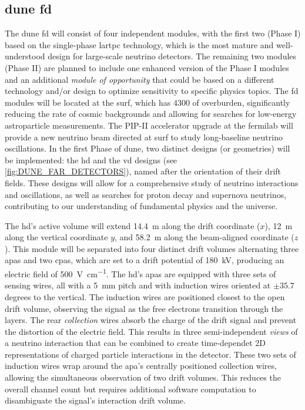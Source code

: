 \subsection{\gls{dune} \acrlong{fd}} \label{sec:DUNE_FD}

The \gls{dune} \gls{fd} will consist of four independent modules, with the first two (Phase I) based on the single-phase \gls{lartpc} technology, which is the most mature and well-understood design for large-scale neutrino detectors. The remaining two modules (Phase II) are planned to include one enhanced version of the Phase I modules and an additional \textit{module of opportunity} that could be based on a different technology and/or design to optimize sensitivity to specific physics topics. The \gls{fd} modules will be located at the \gls{surf}, which has \SI{4300}{\metersofwater} of overburden, significantly reducing the rate of cosmic backgrounds and allowing for searches for low-energy astroparticle measurements. The PIP-II accelerator upgrade at the \gls{fermilab} will provide a new neutrino beam directed at \gls{surf} to study long-baseline neutrino oscillations. In the first Phase of \gls{dune}, two distinct designs (or geometries) will be implemented: the \gls{hd} and the \gls{vd} designs (see \cref{fig:DUNE_FAR_DETECTORS}), named after the orientation of their drift fields. These designs will allow for a comprehensive study of neutrino interactions and oscillations, as well as searches for proton decay and supernova neutrinos, contributing to our understanding of fundamental physics and the universe.

The \gls{hd}'s active volume will extend \SI{14.4}{\meter} along the drift coordinate ($x$), \SI{12}{\meter} along the vertical coordinate $y$, and \SI{58.2}{\meter} along the beam-aligned coordinate ($z$). This module will be separated into four distinct drift volumes alternating three \glspl{apa} and two \glspl{cpa}, which are set to a drift potential of \SI{180}{\kilo\volt}, producing an electric field of \SI{500}{\volt\per\centi\meter}. The \gls{hd}'s \glspl{apa} are equipped with three sets of sensing wires, all with a \SI{5}{\milli\metre} pitch and with induction wires oriented at $\pm35.7$ degrees to the vertical. The induction wires are positioned closest to the open drift volume, observing the signal as the free electrons transition through the layers. The rear \textit{collection} wires absorb the charge of the drift signal and prevent the distortion of the electric field. This results in three semi-independent \textit{views} of a neutrino interaction that can be combined to create time-dependet 2D representations of charged particle interactions in the detector. These two sets of induction wires wrap around the \gls{apa}'s centrally positioned collection wires, allowing the simultaneous observation of two drift volumes. This reduces the overall channel count but requires additional software computation to disambiguate the signal's interaction drift volume.

